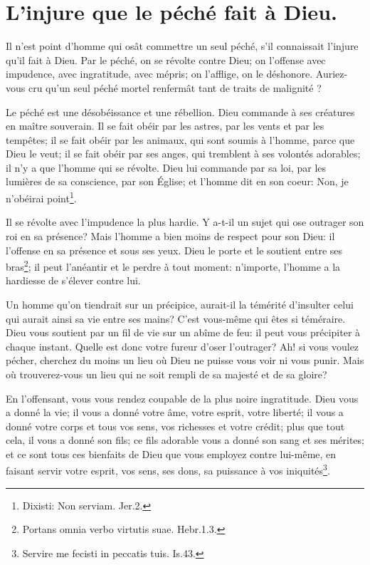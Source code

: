 \documentclass[instructions.tex]{subfiles}
\begin{document}
 
\chapter{L'injure que le péché fait à Dieu.}
 

Il n'est point d'homme qui osât commettre un seul péché, s'il connaissait l'injure qu'il fait à Dieu. Par le péché, on se révolte contre Dieu; on l'offense avec impudence, avec ingratitude, avec mépris; on l'afflige, on le déshonore. Auriez-vous cru qu'un seul péché mortel renfermât tant de traits de malignité ?

\primo Le péché est une désobéissance et une rébellion. Dieu commande à ses créatures en maître souverain. Il se fait obéir par les astres, par les vents et par les tempêtes; il se fait obéir par les animaux, qui sont soumis à l'homme, parce que Dieu le veut; il se fait obéir par ses anges, qui tremblent à ses volontés adorables; il n'y a que l'homme qui se révolte. Dieu lui commande par sa loi, par les lumières de sa conscience, par son Église; et l'homme dit en son coeur: Non, je n'obéirai point\footnote{Dixisti: Non serviam. Jer.2.}.

\secundo Il se révolte avec l'impudence la plus hardie. Y a-t-il un sujet qui ose outrager son roi en sa présence? Mais l'homme a bien moins de respect pour son Dieu: il l'offense en sa présence et sous ses yeux. Dieu le porte et le soutient entre ses bras\footnote{Portans omnia verbo virtutis suae. Hebr.1.3.}; il peut l'anéantir et le perdre à tout moment: n'importe, l'homme a la hardiesse de s'élever contre lui.

Un homme qu'on tiendrait sur un précipice, aurait-il la témérité d'insulter celui qui aurait ainsi sa vie entre ses mains? C'est vous-même qui êtes si téméraire. Dieu vous soutient par un fil de vie sur un abîme de feu: il peut vous précipiter à chaque instant. Quelle est donc votre fureur d'oser l'outrager? Ah! si vous voulez pécher, cherchez du moins un lieu où Dieu ne puisse vous voir ni vous punir. Mais où trouverez-vous un lieu qui ne soit rempli de sa majesté et de sa gloire?

\tertio En l'offensant, vous vous rendez coupable de la plus noire ingratitude. Dieu vous a donné la vie; il vous a donné votre âme, votre esprit, votre liberté; il vous a donné votre corps et tous vos sens, vos richesses et votre crédit; plus que tout cela, il vous a donné son fils; ce fils adorable vous a donné son sang et ses mérites; et ce sont tous ces bienfaits de Dieu que vous employez contre lui-même, en faisant servir votre esprit, vos sens, ses dons, sa puissance à vos iniquités\footnote{Servire me fecisti in peccatis tuis. Is.43.}.
\end{document}
